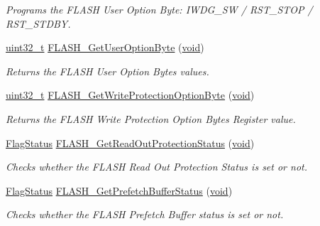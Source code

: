 \begin{DoxyCompactItemize}
\begin{DoxyCompactList}\small\item\em Programs the F\-L\-A\-S\-H User Option Byte\-: I\-W\-D\-G\-\_\-\-S\-W / R\-S\-T\-\_\-\-S\-T\-O\-P / R\-S\-T\-\_\-\-S\-T\-D\-B\-Y. \end{DoxyCompactList}\item 
\hyperlink{stdint_8h_a435d1572bf3f880d55459d9805097f62}{uint32\-\_\-t} \hyperlink{group___f_l_a_s_h___exported___functions_ga31441647fac5fbb38369613076737943}{F\-L\-A\-S\-H\-\_\-\-Get\-User\-Option\-Byte} (\hyperlink{group___n_a_m_e_ga18028b8badbf1ea7e704ccac3c488e82}{void})
\begin{DoxyCompactList}\small\item\em Returns the F\-L\-A\-S\-H User Option Bytes values. \end{DoxyCompactList}\item 
\hyperlink{stdint_8h_a435d1572bf3f880d55459d9805097f62}{uint32\-\_\-t} \hyperlink{group___f_l_a_s_h___exported___functions_gac009e061562c7d36d7d2d00bb1c8aafa}{F\-L\-A\-S\-H\-\_\-\-Get\-Write\-Protection\-Option\-Byte} (\hyperlink{group___n_a_m_e_ga18028b8badbf1ea7e704ccac3c488e82}{void})
\begin{DoxyCompactList}\small\item\em Returns the F\-L\-A\-S\-H Write Protection Option Bytes Register value. \end{DoxyCompactList}\item 
\hyperlink{group___exported__types_ga89136caac2e14c55151f527ac02daaff}{Flag\-Status} \hyperlink{group___f_l_a_s_h___exported___functions_ga57fe56770ff25b358f3e36bd70632e37}{F\-L\-A\-S\-H\-\_\-\-Get\-Read\-Out\-Protection\-Status} (\hyperlink{group___n_a_m_e_ga18028b8badbf1ea7e704ccac3c488e82}{void})
\begin{DoxyCompactList}\small\item\em Checks whether the F\-L\-A\-S\-H Read Out Protection Status is set or not. \end{DoxyCompactList}\item 
\hyperlink{group___exported__types_ga89136caac2e14c55151f527ac02daaff}{Flag\-Status} \hyperlink{group___f_l_a_s_h___exported___functions_ga289bffe7f078d6a130222f03c59bc235}{F\-L\-A\-S\-H\-\_\-\-Get\-Prefetch\-Buffer\-Status} (\hyperlink{group___n_a_m_e_ga18028b8badbf1ea7e704ccac3c488e82}{void})
\begin{DoxyCompactList}\small\item\em Checks whether the F\-L\-A\-S\-H Prefetch Buffer status is set or not. \end{DoxyCompactList}\item 

\end{DoxyCompactItemize}
